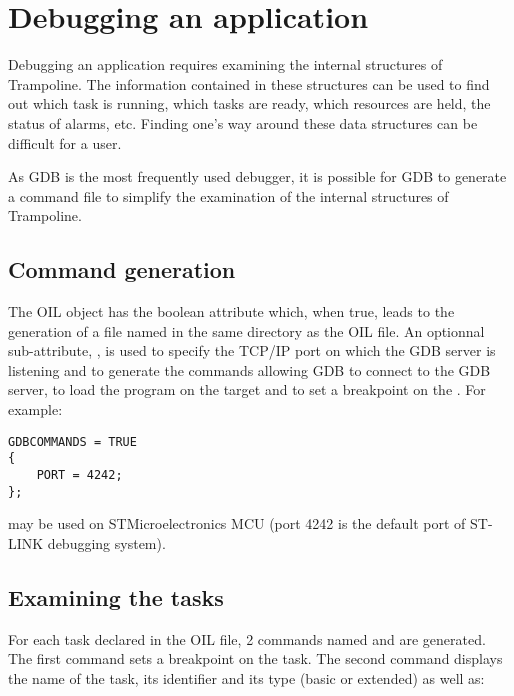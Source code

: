 
\chapter{Debugging an application}


Debugging an application requires examining the internal structures of Trampoline. The information contained in these structures can be used to find out which task is running, which tasks are ready, which resources are held, the status of alarms, etc. Finding one's way around these data structures can be difficult for a user. 

As GDB is the most frequently used debugger, it is possible for GDB to generate a command file to simplify the examination of the internal structures of Trampoline.

\section{Command generation}

The OIL object  has the boolean attribute  which, when true, leads to the generation of a file named  in the same directory as the OIL file. An optionnal sub-attribute, , is used to specify the TCP/IP port on which the GDB server is listening and to generate the commands allowing GDB to connect to the GDB server, to load the program on the target and to set a breakpoint on the . For example:

\begin{lstlisting}[language=OIL]
GDBCOMMANDS = TRUE
{
    PORT = 4242;
};
\end{lstlisting}

may be used on STMicroelectronics MCU (port 4242 is the default port of ST-LINK debugging system). 

\section{Examining the tasks}

For each task declared in the OIL file, 2 commands named  and  are generated. The first command sets a breakpoint on the task. The second command displays the name of the task, its identifier and its type (basic or extended) as well as:

